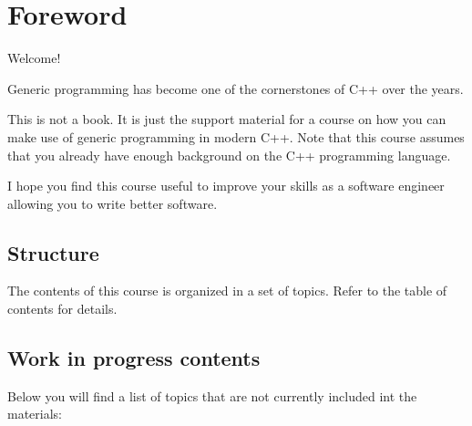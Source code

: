 \chapter*{Foreword}

Welcome!

Generic programming has become one of the cornerstones of C++ over the years.

This is not a book. It is just the support material for a course on how you can
make use of generic programming in modern C++. 
Note that this course assumes that you
already have enough background on the C++ programming language.

I hope you find this course useful to improve your skills as a software
engineer allowing you to write better software.

\section*{Structure}

The contents of this course is organized in a set of topics. 
Refer to the table of contents for details.

\section*{Work in progress contents}

Below you will find a list of topics that are not currently included int the materials:

